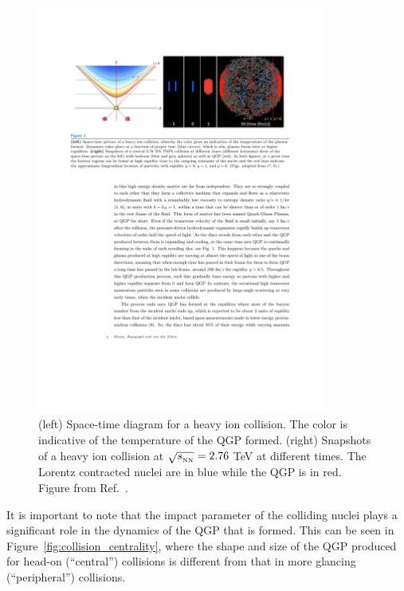 \begin{figure}[htbp]
\begin{center}
\includegraphics[width=0.85\textwidth]{figures/theory/qgp_formation}
\caption{(left) Space-time diagram for a heavy ion collision.
The color is indicative of the temperature of the QGP formed.
(right) Snapshots of a heavy ion collision at $\mbox{$\sqrt{s_{_\text{NN}}}$} = 2.76$ TeV at different times.
The Lorentz contracted nuclei are in blue while the QGP is in red.
Figure from Ref.~\cite{Busza:2018rrf}.}
\label{fig:qgp_form}
\end{center}
\end{figure}

It is important to note that the impact parameter of the colliding nuclei plays a significant role in the dynamics of the QGP that is formed.
This can be seen in Figure~\ref{fig:collision_centrality}, where the shape and size of the QGP produced for head-on (``central'') collisions is different from that in more glancing (``peripheral'') collisions.

